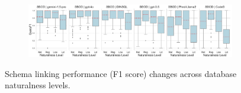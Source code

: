 \begin{figure}
\begin{subfigure}{\textwidth}
    \end{subfigure}
    \begin{subfigure}{\textwidth}
      \centering
      \includegraphics[width=\textwidth]{figures/natlevel-boxplots/natlevel-model-f1-boxplot-SBOD.pdf}
    \end{subfigure}
    \caption{Schema linking performance (F1 score) changes across database naturalness levels.}
    \label{fig:db-level-boxplots-f1-2}
  \end{figure}
  
